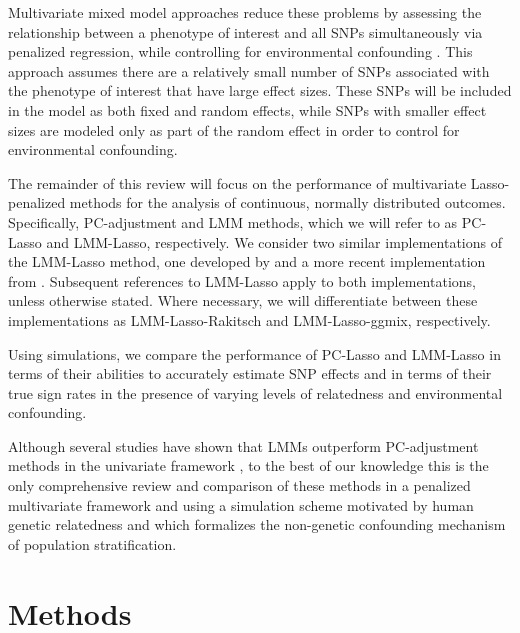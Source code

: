 Multivariate mixed model approaches reduce these problems by assessing the relationship between a phenotype of interest and all SNPs simultaneously via penalized regression, while controlling for environmental confounding  \cite{Rakitsch2012, bhatnagar2019simultaneous}. This approach assumes there are a relatively small number of SNPs associated with the phenotype of interest that have large effect sizes. These SNPs will be included in the model as both fixed and random effects, while SNPs with smaller effect sizes are modeled only as part of the random effect in order to control for environmental confounding. 

The remainder of this review will focus on the performance of multivariate Lasso-penalized methods for the analysis of continuous, normally distributed outcomes. Specifically, PC-adjustment and LMM methods, which we will refer to as PC-Lasso and LMM-Lasso, respectively. We consider two similar implementations of the LMM-Lasso method, one developed by \cite{Rakitsch2012} and a more recent implementation from \cite{bhatnagar2019simultaneous}. Subsequent references to LMM-Lasso apply to both implementations, unless otherwise stated. Where necessary, we will differentiate between these implementations as LMM-Lasso-Rakitsch and LMM-Lasso-ggmix, respectively. 

Using simulations, we compare the performance of PC-Lasso and LMM-Lasso in terms of their abilities to accurately estimate SNP effects and in terms of their true sign rates in the presence of varying levels of relatedness and environmental confounding. 

Although several studies have shown that LMMs outperform PC-adjustment methods in the univariate framework \cite{wang2013analytical, kang2010variance, zhao2007arabidopsis}, to the best of our knowledge this is the only comprehensive review and comparison of these methods in a penalized multivariate framework and using a simulation scheme motivated by human genetic relatedness and which formalizes the non-genetic confounding mechanism of population stratification.\\

\section{Methods}



